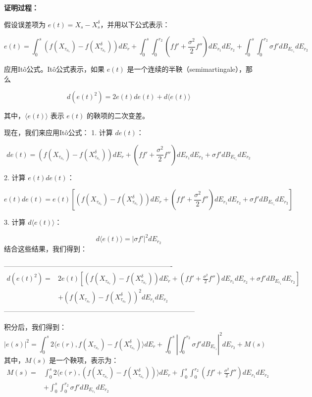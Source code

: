 \documentclass[UTF-8]{article}
\begin{document}
	
	\textbf{证明过程：}
	
	假设误差项为 \( e(t) = X_s - X_s^{\delta} \)，并用以下公式表示：
	
	
	\[
	e(t) = \int_0^s \left( f(X_{\tau_{n_{r}}}) - f(X^{\delta}_{\tau_{n_{r}}}) \right) dE_r + \int_0^s \int_0^{r_2} \left( f f' + \frac{\sigma^2}{2} f'' \right) dE_{r_1} dE_{r_2} + \int_0^s \int_0^{r_2} \sigma f' dB_{E_{r_1}} dE_{r_2}
	\]
	
	
	
	应用Itô公式。Itô公式表示，如果 \( e(t) \) 是一个连续的半鞅（semimartingale），那么
	
	
	\[
	d(e(t)^2) = 2e(t) de(t) + d \langle e(t) \rangle
	\]
	
	
	其中，\( \langle e(t) \rangle \) 表示 \( e(t) \) 的鞅项的二次变差。
	
	现在，我们来应用Itô公式：
	1. 计算 \( de(t) \)：
	
	
	\[
	de(t) = \left( f(X_{\tau_{n_{r}}}) - f(X^{\delta}_{\tau_{n_{r}}}) \right) dE_r + \left( f f' + \frac{\sigma^2}{2} f'' \right) dE_{r_1} dE_{r_2} + \sigma f' dB_{E_{r_1}} dE_{r_2}
	\]
	
	
	
	2. 计算 \( e(t) de(t) \)：
	
	
	\[
	e(t) de(t) = e(t) \left[ \left( f(X_{\tau_{n_{r}}}) - f(X^{\delta}_{\tau_{n_{r}}}) \right) dE_r + \left( f f' + \frac{\sigma^2}{2} f'' \right) dE_{r_1} dE_{r_2} + \sigma f' dB_{E_{r_1}} dE_{r_2} \right]
	\]
	
	3. 计算 \( d \langle e(t) \rangle \)：
	
	
	\[
	d \langle e(t) \rangle = \left| \sigma f' \right|^2 dE_{r_2}
	\]
	结合这些结果，我们得到：
	
	-------------------------------------------------------------------------
	\begin{align*}
			d(e(t)^2) = &2e(t) \left[ \left( f(X_{\tau_{n_{r}}}) - f(X^{\delta}_{\tau_{n_{r}}}) \right) dE_r + \left( f f' + \frac{\sigma^2}{2} f'' \right) dE_{r_1} dE_{r_2} 
			+ \sigma f' dB_{E_{r_1}} dE_{r_2} \right] \\&+ \left( f(X_{\tau_{n_{r}}}) - f(X^{\delta}_{\tau_{n_{r}}}) \right)^2 dE_{r_1}dE_{r_2}
	\end{align*}
	-----------------------------------------------------------------------------------
	
	积分后，我们得到：
	\[
	|e(s)|^2 = \int_0^s 2 \langle e(r), f(X_{\tau_{n_{r}}}) - f(X^{\delta}_{\tau_{n_{r}}}) \rangle dE_r + \int_0^s \left| \int_0^{r_2} \sigma f' dB_{E_{r_1}} \right|^2 dE_{r_2} + M(s)
	\]
	其中，\( M(s) \) 是一个鞅项，表示为：
	\begin{align*}
			M(s) = &\int_0^s 2 \langle e(r), \left( f(X_{\tau_{n_{r}}}) - f(X^{\delta}_{\tau_{n_{r}}}) \right) \rangle dE_r + \int_0^s \int_0^{r_2} \left( f f' + \frac{\sigma^2}{2} f'' \right) dE_{r_1} dE_{r_2} \\
			&+ \int_0^s \int_0^{r_2} \sigma f' dB_{E_{r_1}} dE_{r_2}
	\end{align*}
	
	
\end{document}
